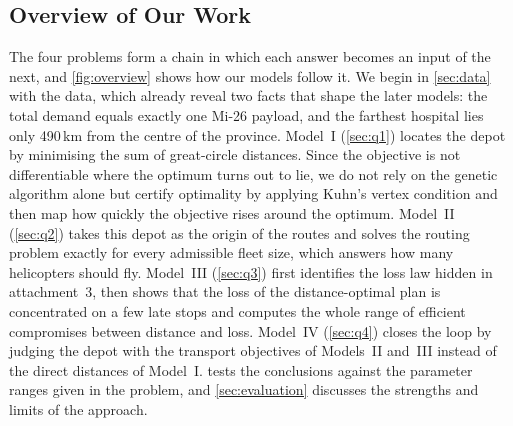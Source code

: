 \documentclass[11pt,a4paper]{article}
\theoremstyle{definition}
\begin{document}
\subsection{Overview of Our Work}
The four problems form a chain in which each answer becomes an input of the next, and \cref{fig:overview} shows how our models follow it.
We begin in \cref{sec:data} with the data, which already reveal two facts that shape the later models: the total demand equals exactly one Mi-26 payload, and the farthest hospital lies only 490\,km from the centre of the province.
Model~I (\cref{sec:q1}) locates the depot by minimising the sum of great-circle distances.
Since the objective is not differentiable where the optimum turns out to lie, we do not rely on the genetic algorithm alone but certify optimality by applying Kuhn's vertex condition and then map how quickly the objective rises around the optimum.
Model~II (\cref{sec:q2}) takes this depot as the origin of the routes and solves the routing problem exactly for every admissible fleet size, which answers how many helicopters should fly.
Model~III (\cref{sec:q3}) first identifies the loss law hidden in attachment~3, then shows that the loss of the distance-optimal plan is concentrated on a few late stops and computes the whole range of efficient compromises between distance and loss.
Model~IV (\cref{sec:q4}) closes the loop by judging the depot with the transport objectives of Models~II and~III instead of the direct distances of Model~I.
 tests the conclusions against the parameter ranges given in the problem, and \cref{sec:evaluation} discusses the strengths and limits of the approach.
\end{document}
